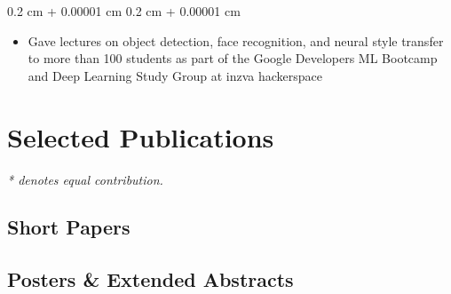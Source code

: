 \documentclass[10pt, letterpaper]{article}
\newif\ifshortcv
\newenvironment{highlights}{
    \begin{itemize}[
        topsep=0.10 cm,
        parsep=0.10 cm,
        partopsep=0pt,
        itemsep=0pt,
        leftmargin=0.4 cm + 10pt
    ]
}{
    \end{itemize}
} %
\newenvironment{onecolentry}{
    \begin{adjustwidth}{
        0.2 cm + 0.00001 cm
    }{
        0.2 cm + 0.00001 cm
    }
}{
    \end{adjustwidth}
} %
\begin{document}
        \vspace{0.10 cm}
        \begin{onecolentry}
            \begin{highlights}
                \item Gave lectures on object detection, face recognition, and neural style transfer to more than 100 students as part of the Google Developers ML Bootcamp and Deep Learning Study Group at inzva hackerspace
            \end{highlights}
        \end{onecolentry}


        \vspace{0.2 cm}


\section{Selected Publications}
\textit{* denotes equal contribution.}

\begin{refcontext}[labelprefix=FP]
    \nocite{*} 
    \printbibliography[keyword={paper}, heading=none, resetnumbers=true, locallabelwidth]
\end{refcontext}

\ifshortcv
\else

    \begin{refcontext}[labelprefix=SP]
        \subsection{Short Papers}
        \nocite{*} 
        \printbibliography[keyword={short}, heading=none, resetnumbers=true, locallabelwidth]
    \end{refcontext}


    \begin{refcontext}[labelprefix=PEA]
        \subsection{Posters \& Extended Abstracts}
        \nocite{*} 
        \printbibliography[keyword={poster}, heading=none, resetnumbers=true, locallabelwidth]
    \end{refcontext}
\fi
   
\end{document}
